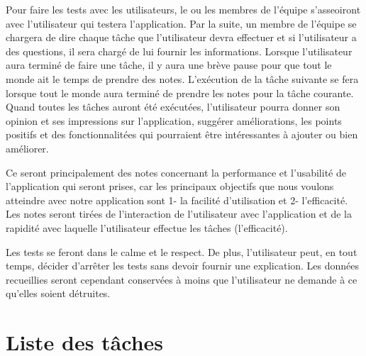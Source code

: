 \documentclass[letterpaper, oneside, 12pt, these, creativecommons]{thETS}
\begin{document}
Pour faire les tests avec les utilisateurs, le ou les membres de l'équipe s'asseoiront avec l'utilisateur qui testera l'application. Par la suite, un membre de l'équipe se chargera de dire chaque tâche que l'utilisateur devra effectuer et si l'utilisateur a des questions, il sera chargé de lui fournir les informations. Lorsque l'utilisateur aura terminé de faire une tâche, il y aura une brève pause pour que tout le monde ait le temps de prendre des notes. L'exécution de la tâche suivante se fera lorsque tout le monde aura terminé de prendre les notes pour la tâche courante. Quand toutes les tâches auront été exécutées, l'utilisateur pourra donner son opinion et ses impressions sur l'application, suggérer améliorations, les points positifs et des fonctionnalitées qui pourraient être intéressantes à ajouter ou bien améliorer.

Ce seront principalement des notes concernant la performance et l'usabilité de l'application qui seront prises, car les principaux objectifs que nous voulons atteindre avec notre application sont 1- la facilité d'utilisation et 2- l'efficacité. Les notes seront tirées de l'interaction de l'utilisateur avec l'application et de la rapidité avec laquelle l'utilisateur effectue les tâches (l'efficacité).

Les tests se feront dans le calme et le respect. De plus, l'utilisateur peut, en tout temps, décider d'arrêter les tests sans devoir fournir une explication. Les données recueillies seront cependant conservées à moins que l'utilisateur ne demande à ce qu'elles soient détruites.

\newpage

\section{Liste des tâches}
\end{document}
